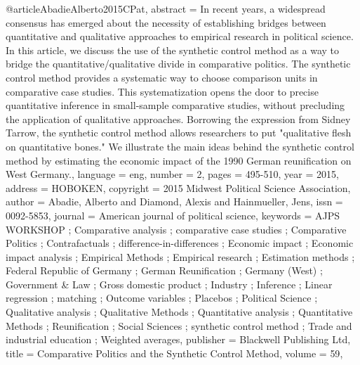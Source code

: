 @article{AbadieAlberto2015CPat,
abstract = {In recent years, a widespread consensus has emerged about the necessity of establishing bridges between quantitative and qualitative approaches to empirical research in political science. In this article, we discuss the use of the synthetic control method as a way to bridge the quantitative/qualitative divide in comparative politics. The synthetic control method provides a systematic way to choose comparison units in comparative case studies. This systematization opens the door to precise quantitative inference in small-sample comparative studies, without precluding the application of qualitative approaches. Borrowing the expression from Sidney Tarrow, the synthetic control method allows researchers to put "qualitative flesh on quantitative bones." We illustrate the main ideas behind the synthetic control method by estimating the economic impact of the 1990 German reunification on West Germany.},
language = {eng},
number = {2},
pages = {495-510},
year = {2015},
address = {HOBOKEN},
copyright = {2015 Midwest Political Science Association},
author = {Abadie, Alberto and Diamond, Alexis and Hainmueller, Jens},
issn = {0092-5853},
journal = {American journal of political science},
keywords = {AJPS WORKSHOP ; Comparative analysis ; comparative case studies ; Comparative Politics ; Contrafactuals ; difference-in-differences ; Economic impact ; Economic impact analysis ; Empirical Methods ; Empirical research ; Estimation methods ; Federal Republic of Germany ; German Reunification ; Germany (West) ; Government & Law ; Gross domestic product ; Industry ; Inference ; Linear regression ; matching ; Outcome variables ; Placebos ; Political Science ; Qualitative analysis ; Qualitative Methods ; Quantitative analysis ; Quantitative Methods ; Reunification ; Social Sciences ; synthetic control method ; Trade and industrial education ; Weighted averages},
publisher = {Blackwell Publishing Ltd},
title = {Comparative Politics and the Synthetic Control Method},
volume = {59},
}
